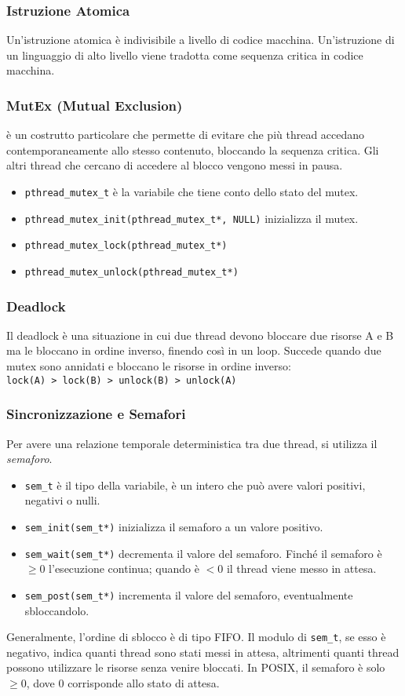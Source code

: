\documentclass[10pt,a4paper]{article}
\newcommand{\code}{\texttt}
\begin{document}
    \subsubsection{Istruzione Atomica}
    Un'istruzione atomica è indivisibile a livello di codice macchina. Un'istruzione di un linguaggio di alto livello viene tradotta come sequenza critica in codice macchina.
    \subsubsection{MutEx (Mutual Exclusion)}
    è un costrutto particolare che permette di evitare che pi\`u thread accedano contemporaneamente allo stesso contenuto, bloccando la sequenza critica. Gli altri thread che cercano di accedere al blocco vengono messi in pausa.
    \begin{itemize}
        \item \code{pthread\_mutex\_t} è la variabile che tiene conto dello stato del mutex.
        \item \code{pthread\_mutex\_init(pthread\_mutex\_t*, NULL)} inizializza il mutex.
        \item \code{pthread\_mutex\_lock(pthread\_mutex\_t*)}
        \item \code{pthread\_mutex\_unlock(pthread\_mutex\_t*)}
    \end{itemize}
    \subsubsection{Deadlock}
    Il deadlock è una situazione in cui due thread devono bloccare due risorse A e B ma le bloccano in ordine inverso, finendo cos\`i in un loop. Succede quando due mutex sono annidati e bloccano le risorse in ordine inverso:\\
    \code{lock(A) > lock(B) > unlock(B) > unlock(A)}
    \subsubsection{Sincronizzazione e Semafori}
    Per avere una relazione temporale deterministica tra due thread, si utilizza il \emph{semaforo}.
    \begin{itemize}
        \item \code{sem\_t} è il tipo della variabile, è un intero che può avere valori positivi, negativi o nulli.
        \item \code{sem\_init(sem\_t*)} inizializza il semaforo a un valore positivo.
        \item \code{sem\_wait(sem\_t*)} decrementa il valore del semaforo. Finché il semaforo è $\geq 0$ l'esecuzione continua; quando è $< 0$ il thread viene messo in attesa.
        \item \code{sem\_post(sem\_t*)} incrementa il valore del semaforo, eventualmente sbloccandolo.
    \end{itemize}
    Generalmente, l'ordine di sblocco è di tipo FIFO. Il modulo di \code{sem\_t}, se esso è negativo, indica quanti thread sono stati messi in attesa, altrimenti quanti thread possono utilizzare le risorse senza venire bloccati. In POSIX, il semaforo è solo $\geq 0$, dove 0 corrisponde allo stato di attesa.
\end{document}
